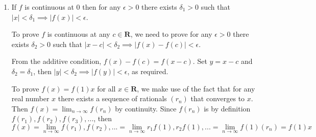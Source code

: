 \documentclass{oxmathproblems}
\begin{document}
\begin{questions}
\begin{solution}
\begin{enumerate}[label=(\alph*)]
    Then $f(\frac{m}{n})=mf(\frac{1}{n})=\frac{m}{n}f(1)$, as required. The case for negative $m$ is very similar.

    *follow-up improvements:
    \begin{enumerate}
      \item For proving the $\textbf{Z}$ case for negative $z$, we can write $z=-m$ with $m \in \textbf{N}$, then $f(-m)=-f(m)=-mf(1)=zf(1)$. Slightly shorter.
      \item Likewise, to prove $f(zx)=zf(x)$ for negative $z$, use $z=-m$ again, then $f(zx)=-f(mx)=-mf(x)=zf(x)$.
      \item For the rational part, another way is to first prove that $nf(\frac{m}{n})=f(n \cdot \frac{m}{n})=f(m)=mf(1)$. Combining the first and last equality
      immediately gives the desired result.
    \end{enumerate}

    \item If $f$ is continuous at 0 then for any $\epsilon > 0$ there exists $\delta_{1} > 0$ such that $|x| < \delta_{1} \implies |f(x)| < \epsilon$.
    
    To prove $f$ is continuous at any $c \in \textbf{R}$, we need to prove for any $\epsilon > 0$ there exists $\delta_{2} > 0$ such that $|x-c| < \delta_{2} \implies |f(x)-f(c)| < \epsilon$.

    From the additive condition, $f(x)-f(c)=f(x-c)$. Set $y=x-c$ and $\delta_{2}=\delta_{1}$, then $|y| < \delta_{2} \implies |f(y)| < \epsilon$, as required.

    To prove $f(x)=f(1)x$ for all $x \in \textbf{R}$, we make use of the fact that for any real number $x$ there exists a sequence of rationals $(r_{n})$ that converges to $x$.
    Then $f(x) = \lim_{n \to \infty}f(r_{n})$ by continuity. Since $f(r_{n})$ is by definition $f(r_{1}), f(r_{2}), f(r_{3}), ...$, then
    \[f(x) = \lim_{n \to \infty} f(r_{1}), f(r_{2}), ... = \lim_{n \to \infty} r_{1}f(1), r_{2}f(1), ... = \lim_{n \to \infty} f(1)(r_{n})=f(1)x\]
  \end{enumerate}
\end{solution}

\end{questions}
\end{document}
